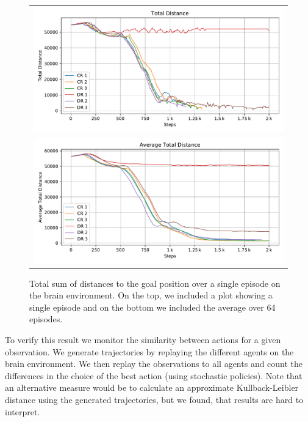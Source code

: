 \begin{figure}[htp]
    \begin{center}
        \begin{tabular}{c}
            \includegraphics[clip, width=0.95\columnwidth]{figures/evaluation/rewards/episode_analysis/maze0122_total_dist.pdf} \\
            \includegraphics[clip, width=0.95\columnwidth]{figures/evaluation/rewards/episode_analysis/maze0122_total_dist_avg.pdf} \\
        \end{tabular}
    \end{center}
    \caption[Episode metrics on the Brain Environment]{Total sum of distances to the goal position over a single episode on the brain environment. On the top, we included a plot showing a single episode and on the bottom we included the average over 64 episodes.} \label{fig:Rewards/Ep_Analysis}
\end{figure}

To verify this result we monitor the similarity between actions for a given observation. We generate trajectories by replaying the different agents on the brain environment. We then replay the observations to all agents and count the differences in the choice of the best action (using stochastic policies). Note that an alternative measure would be to calculate an approximate Kullback-Leibler distance using the generated trajectories, but we found, that results are hard to interpret.

